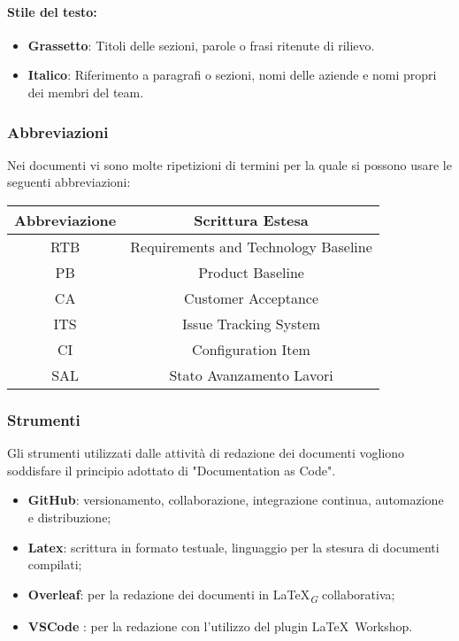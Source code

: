 \paragraph*{Stile del testo:}
\begin{itemize}
    \item \textbf{Grassetto}: Titoli delle sezioni, parole o frasi ritenute di rilievo.
    \item \textbf{Italico}: Riferimento a paragrafi o sezioni, nomi delle aziende e nomi propri dei membri del team.
\end{itemize}
\subsubsection{Abbreviazioni}
Nei documenti vi sono molte ripetizioni di termini per la quale si possono usare le seguenti abbreviazioni:\\
\vspace{0.2cm}
\begin{tabular}{|c|c|}
    \hline
    \textbf{Abbreviazione} & \textbf{Scrittura Estesa}            \\
    \hline
    RTB                    & Requirements and Technology Baseline \\
    PB                     & Product Baseline                     \\
    CA                     & Customer Acceptance                  \\
    ITS                    & Issue Tracking System                \\
    CI                     & Configuration Item                   \\
    SAL                    & Stato Avanzamento Lavori             \\   
    \hline
\end{tabular}

\subsubsection{Strumenti}
Gli strumenti utilizzati dalle attività di redazione dei documenti vogliono soddisfare il principio adottato di "Documentation as Code".
\begin{itemize}
    \item \textbf{GitHub}: versionamento, collaborazione, integrazione continua, automazione e distribuzione;
    \item \textbf{Latex}: scrittura in formato testuale, linguaggio per la stesura di documenti compilati;
    \item \textbf{Overleaf}: per la redazione dei documenti in \LaTeX\textsubscript{\textit{G}} collaborativa;
    \item \textbf{VSCode} : per la redazione con l'utilizzo del plugin \LaTeX\ Workshop.
\end{itemize}
